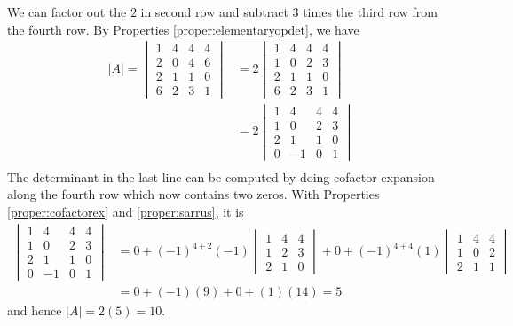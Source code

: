 \begin{solution}
We can factor out the $2$ in second row and subtract $3$ times the third row from the fourth row. By Properties \ref{proper:elementaryopdet}, we have
\begin{align*}
|A| = 
\begin{vmatrix}
1 & 4 & 4 & 4 \\
2 & 0 & 4 & 6 \\
2 & 1 & 1 & 0 \\
6 & 2 & 3 & 1
\end{vmatrix}
&=
2
\begin{vmatrix}
1 & 4 & 4 & 4 \\
1 & 0 & 2 & 3 \\
2 & 1 & 1 & 0 \\
6 & 2 & 3 & 1
\end{vmatrix} \\
&= 
2
\begin{vmatrix}
1 & 4 & 4 & 4 \\
1 & 0 & 2 & 3 \\
2 & 1 & 1 & 0 \\
0 & -1 & 0 & 1
\end{vmatrix} \\
\end{align*}
The determinant in the last line can be computed by doing cofactor expansion along the fourth row which now contains two zeros. With Properties \ref{proper:cofactorex} and \ref{proper:sarrus}, it is
\begin{align*}
\begin{vmatrix}
1 & 4 & 4 & 4 \\
1 & 0 & 2 & 3 \\
2 & 1 & 1 & 0 \\
0 & -1 & 0 & 1
\end{vmatrix}
&= 0 + (-1)^{4+2}(-1)
\begin{vmatrix}
1 & 4 & 4 \\
1 & 2 & 3 \\
2 & 1 & 0 
\end{vmatrix} 
+ 0 + (-1)^{4+4}(1)
\begin{vmatrix}
1 & 4 & 4 \\
1 & 0 & 2 \\
2 & 1 & 1 
\end{vmatrix} \\
&= 0 + (-1)(9) + 0 + (1)(14) = 5
\end{align*}
and hence $|A| = 2(5) = 10$.
\end{solution}

